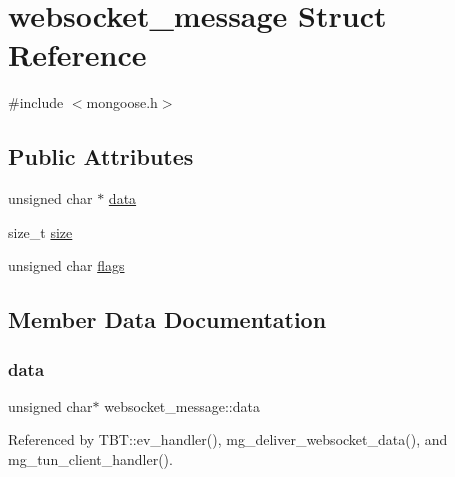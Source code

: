 \hypertarget{structwebsocket__message}{}\section{websocket\+\_\+message Struct Reference}
\label{structwebsocket__message}


{\ttfamily \#include $<$mongoose.\+h$>$}

\subsection*{Public Attributes}
\begin{DoxyCompactItemize}
\item 
unsigned char $\ast$ \hyperlink{structwebsocket__message_aeb8922c34831455b764d83083ae39968_aeb8922c34831455b764d83083ae39968}{data}
\item 
size\+\_\+t \hyperlink{structwebsocket__message_af7ae89c0cba9566b64a47d40c5ea700a_af7ae89c0cba9566b64a47d40c5ea700a}{size}
\item 
unsigned char \hyperlink{structwebsocket__message_a72b32c83b4a065faac7ae28802a5adf1_a72b32c83b4a065faac7ae28802a5adf1}{flags}
\end{DoxyCompactItemize}


\subsection{Member Data Documentation}
\mbox{\label{structwebsocket__message_aeb8922c34831455b764d83083ae39968_aeb8922c34831455b764d83083ae39968}} 
\subsubsection{\texorpdfstring{data}{data}}
{\footnotesize\ttfamily unsigned char$\ast$ websocket\+\_\+message\+::data}



Referenced by T\+B\+T\+::ev\+\_\+handler(), mg\+\_\+deliver\+\_\+websocket\+\_\+data(), and mg\+\_\+tun\+\_\+client\+\_\+handler().

\mbox{\label{structwebsocket__message_a72b32c83b4a065faac7ae28802a5adf1_a72b32c83b4a065faac7ae28802a5adf1}} 
